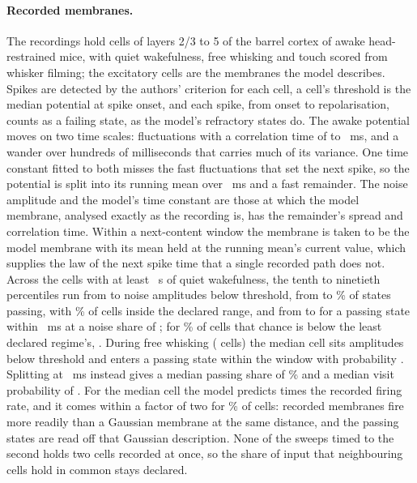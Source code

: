 \documentclass[12pt]{article}
\begin{document}
\paragraph{Recorded membranes.} The recordings \citep{kiritani2023} hold
\uRecCellsTotal{} cells of layers 2/3 to 5 of the barrel cortex of awake
head-restrained mice, with quiet wakefulness, free whisking and touch scored from
whisker filming; the excitatory cells are the membranes the model describes.
Spikes are detected by the authors' criterion for each cell, a cell's threshold is
the median potential at spike onset, and each spike, from onset to
repolarisation, counts as a failing state, as the model's refractory states do.
The awake potential moves on two time scales: fluctuations with a correlation
time of \uRecFastMsLow{} to \uRecFastMsHigh{}~ms, and a wander over hundreds of
milliseconds that carries much of its variance. One time constant fitted to both
misses the fast fluctuations that set the next spike, so the potential is split
into its running mean over \uRecSlowMs{}~ms and a fast remainder. The noise
amplitude and the model's time constant are those at which the model membrane,
analysed exactly as the recording is, has the remainder's spread and correlation
time. Within a next-content window the membrane is taken to be the model membrane
with its mean held at the running mean's current value, which supplies the law
of the next spike time that a single recorded path does not. Across the
\uRecCellsQuiet{} cells with at least \uRecMinStateS{}~s of quiet wakefulness, the
tenth to ninetieth percentiles run from \uRecDistanceLow{} to
\uRecDistanceHigh{} noise amplitudes below threshold, from
\uRecPassLowPercent{} to \uRecPassHighPercent\% of states passing, with
\uRecPassInsidePercent\% of cells inside the declared range, and from
\uRecHitLowLong{} to \uRecHitHighLong{} for a passing state within
\uOccContentLongMs{}~ms at a noise share of \uOccShareMin{}; for
\uRecHitBelowPercent\% of cells that chance is below the least declared regime's,
\uOccHitMinLong{}. During free whisking (\uRecCellsWhisk{} cells) the median cell
sits \uRecDistanceMedWhisk{} amplitudes below threshold and enters a passing state
within the window with probability \uRecHitMedLongWhisk{}. Splitting at
\uRecSlowAltMs{}~ms instead gives a median passing share of
\uRecPassMedPercentAlt\% and a median visit probability of \uRecHitMedLongAlt{}.
For the median cell the model predicts \uRecRateRatioMed{} times the recorded
firing rate, and it comes within a factor of two for \uRecRateWithinTwoPercent\%
of cells: recorded membranes fire more readily than a Gaussian membrane at the
same distance, and the passing states are read off that Gaussian description. None
of the \uRecTimedSweeps{} sweeps timed to the second holds two cells recorded at
once, so the share of input that neighbouring cells hold in common stays declared.
\end{document}

